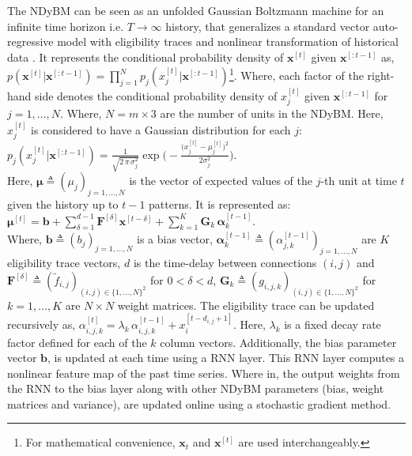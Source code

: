 \documentclass{article}
\begin{document}
The NDyBM can be seen as an unfolded Gaussian Boltzmann machine for an infinite time horizon i.e. $T \rightarrow \infty$ history, that generalizes a standard vector auto-regressive model with eligibility traces and nonlinear transformation of historical data  \cite{dasgupta2017nonlinear}. It represents the conditional probability density of 
$\mathbf{x}^{[t]}$ given $\mathbf{x}^{[:t-1]}$ as, $ p(\mathbf{x}^{[t]} | \mathbf{x}^{[:t-1]})
 = \prod_{j=1}^N p_j(x_j^{[t]} | \mathbf{x}^{[:t-1]})$\footnote{For mathematical convenience, $\mathbf{x}_t$ and $\mathbf{x}^{[t]}$ are used interchangeably. }. Where, each factor of the right-hand side denotes the conditional probability density of $x_j^{[t]}$ given
$\mathbf{x}^{[:t-1]}$ for $j=1,\ldots,N$. Where, $N= m\times 3$ are the number of units in the NDyBM. Here, $x_j^{[t]}$ is considered to have a Gaussian distribution for each $j$:\\$
 p_j(x_j^{[t]} | \mathbf{x}^{[:t-1]}) = \frac{1}{\sqrt{2\,\pi\,\sigma_j^2}}\exp\Big(-\frac{\big(x_j^{[t]}-\mu_j^{[t]}\big)^2}{2\sigma_j^2}\Big)$. \\ Here,  
$\boldsymbol{\mu}\triangleq(\mu_j)_{j=1,\ldots,N}$ is the vector of expected values of the $j$-th unit at time $t$ given the history up to $t-1$ patterns. It is represented as: \\
$\boldsymbol{\mu}^{[t]}= \mathbf{b} + \sum_{\delta=1}^{d-1} \mathbf{F}^{[\delta]}\mathbf{x}^{[t-\delta]} + \sum_{k=1}^K \mathbf{G}_k \, \boldsymbol{\alpha}_k^{[t-1]}$.\\
Where, $\mathbf{b}\triangleq(b_j)_{j=1,\ldots,N}$ is a bias vector,
$\boldsymbol{\alpha}_k^{[t-1]}\triangleq(\alpha_{j,k}^{[t-1]})_{j=1,\ldots,N}$ are $K$ eligibility trace vectors, $d$ is the time-delay between connections $(i,j)$ and \\
$\mathbf{F}^{[\delta]}\triangleq(\tilde f_{i,j})_{(i,j)\in\{1,\ldots,N\}^2}$ for $0<\delta<d$, $\mathbf{G}_k\triangleq(g_{i,j,k})_{(i,j)\in\{1,\ldots,N\}^2}$ for $k=1,\ldots,K$ are $N\times N$ weight matrices. The eligibility trace can be updated recursively as, $\alpha_{i,j,k}^{[t]} = \lambda_k \, \alpha_{i,j,k}^{[t-1]} + x_i^{[t-d_{i,j}+1]}$. Here, $\lambda_k$ is a fixed decay rate factor defined for each of the $k$ column vectors. Additionally, the bias parameter vector $\mathbf{b}$, is updated at each time using a RNN layer. This RNN layer computes a nonlinear feature map of the past time series. Where in, the output weights from the RNN to the bias layer along with other NDyBM parameters (bias, weight matrices and variance), are updated online using a stochastic gradient method. 
\end{document}
